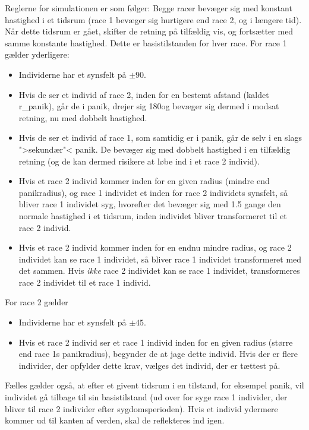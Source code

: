 \documentclass[a4paper,10pt]{article} 	%
\numberwithin{equation}{section}
\begin{document}
	Reglerne for simulationen er som følger: Begge racer bevæger sig med konstant hastighed i et tidsrum (race 1 bevæger sig hurtigere end race 2, og i længere tid). Når dette tidsrum er gået, skifter de retning på tilfældig vis, og fortsætter med samme konstante hastighed. Dette er basistilstanden for hver race. For race 1 gælder yderligere:
	\begin{itemize}
		\item Individerne har et synsfelt på $ \pm 90 $\Deg.
		\item Hvis de ser et individ af race 2, inden for en bestemt afstand (kaldet r\_panik), går de i panik, drejer sig 180\Deg og bevæger sig dermed i modsat retning, nu med dobbelt hastighed.
		\item Hvis de ser et individ af race 1, som samtidig er i panik, går de selv i en slags ">sekundær"< panik. De bevæger sig med dobbelt hastighed i en tilfældig retning (og de kan dermed risikere at løbe ind i et race 2 individ).
		\item Hvis et race 2 individ kommer inden for en given radius (mindre end panikradius), og race 1 individet et inden for race 2 individets synsfelt, så bliver race 1 individet syg, hvorefter det bevæger sig med 1.5 gange den normale hastighed i et tidsrum, inden individet bliver transformeret til et race 2 individ.
		\item Hvis et race 2 individ kommer inden for en endnu mindre radius, og race 2 individet kan se race 1 individet, så bliver race 1 individet transformeret med det sammen. Hvis \textit{ikke} race 2 individet kan se race 1 individet, transformeres race 2 individet til et race 1 individ.
	\end{itemize}

	For race 2 gælder
	\begin{itemize}
		\item Individerne har et synsfelt på $ \pm 45 $\Deg.
		\item Hvis et race 2 individ ser et race 1 individ inden for en given radius (større end race 1s panikradius), begynder de at jage dette individ. Hvis der er flere individer, der opfylder dette krav, vælges det individ, der er tættest på.
	\end{itemize}
	Fælles gælder også, at efter et givent tidsrum i en tilstand, for eksempel panik, vil individet gå tilbage til sin basistilstand (ud over for syge race 1 individer, der bliver til race 2 individer efter sygdomsperioden). Hvis et individ ydermere kommer ud til kanten af verden, skal de reflekteres ind igen.
	
\end{document}
